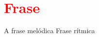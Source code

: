 \section{\textcolor{red}{Frase}}

\cite[pp. 150]{medteoria}
\cite[pp. 624]{latham2008diccionario}

A frase melódica
Frase rítmica
